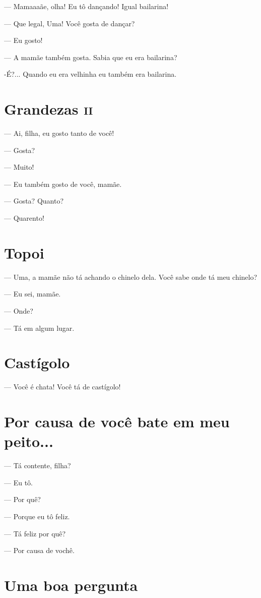 {— Mamaaaãe, olha! Eu tô dançando! Igual bailarina!

— Que legal, Uma! Você gosta de dançar?

— Eu gosto!

— A mamãe também gosta. Sabia que eu era bailarina?

-É?... Quando eu era velhinha eu também era bailarina.

\chapter{Grandezas \textsc{ii}}

— Ai, filha, eu gosto tanto de você!

— Gosta?

— Muito!

— Eu também gosto de você, mamãe.

— Gosta? Quanto?

— Quarento!

\chapter{Topoi}

— Uma, a mamãe não tá achando o chinelo dela. Você sabe onde tá meu
chinelo?

— Eu sei, mamãe.

— Onde?

— Tá em algum lugar.

\chapter{Castígolo}

— Você é chata! Você tá de castígolo!

\chapter{Por causa de você bate em meu peito...}

— Tá contente, filha?

— Eu tô.

— Por quê?

— Porque eu tô feliz.

— Tá feliz por quê?

— Por causa de vochê.

\chapter{Uma boa pergunta}

}
